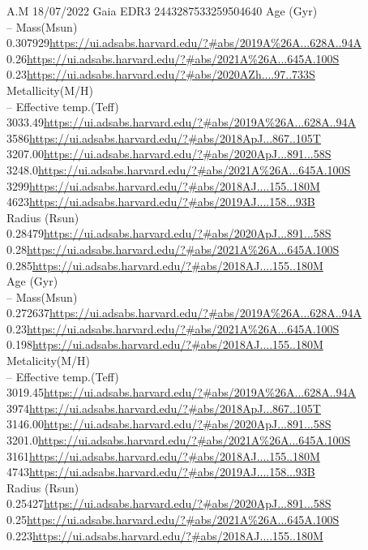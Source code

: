 A.M 18/07/2022
Gaia EDR3 2443287533259504640
Age (Gyr)\\
--
Mass(Msun)\\
0.307929\url{https://ui.adsabs.harvard.edu/?#abs/2019A%26A...628A..94A}\\
0.26\url{https://ui.adsabs.harvard.edu/?#abs/2021A%26A...645A.100S}\\
0.23\url{https://ui.adsabs.harvard.edu/?#abs/2020AZh....97..733S}\\
Metallicity(M/H)\\
--
Effective temp.(Teff)\\
3033.49\url{https://ui.adsabs.harvard.edu/?#abs/2019A%26A...628A..94A}\\
3586\url{https://ui.adsabs.harvard.edu/?#abs/2018ApJ...867..105T}\\
3207.00\url{https://ui.adsabs.harvard.edu/?#abs/2020ApJ...891...58S}\\
3248.0\url{https://ui.adsabs.harvard.edu/?#abs/2021A%26A...645A.100S}\\
3299\url{https://ui.adsabs.harvard.edu/?#abs/2018AJ....155..180M}\\
4623\url{https://ui.adsabs.harvard.edu/?#abs/2019AJ....158...93B}\\
Radius (Rsun)\\
0.28479\url{https://ui.adsabs.harvard.edu/?#abs/2020ApJ...891...58S}\\
0.28\url{https://ui.adsabs.harvard.edu/?#abs/2021A%26A...645A.100S}\\
0.285\url{https://ui.adsabs.harvard.edu/?#abs/2018AJ....155..180M}\\

Age (Gyr)\\
--
Mass(Msun)\\
0.272637\url{https://ui.adsabs.harvard.edu/?#abs/2019A%26A...628A..94A}\\
0.23\url{https://ui.adsabs.harvard.edu/?#abs/2021A%26A...645A.100S}\\
0.198\url{https://ui.adsabs.harvard.edu/?#abs/2018AJ....155..180M}\\
Metalicity(M/H)\\
--
Effective temp.(Teff)\\
3019.45\url{https://ui.adsabs.harvard.edu/?#abs/2019A%26A...628A..94A}\\
3974\url{https://ui.adsabs.harvard.edu/?#abs/2018ApJ...867..105T}\\
3146.00\url{https://ui.adsabs.harvard.edu/?#abs/2020ApJ...891...58S}\\
3201.0\url{https://ui.adsabs.harvard.edu/?#abs/2021A%26A...645A.100S}\\
3161\url{https://ui.adsabs.harvard.edu/?#abs/2018AJ....155..180M}\\
4743\url{https://ui.adsabs.harvard.edu/?#abs/2019AJ....158...93B}\\
Radius (Rsun)\\
0.25427\url{https://ui.adsabs.harvard.edu/?#abs/2020ApJ...891...58S}\\
0.25\url{https://ui.adsabs.harvard.edu/?#abs/2021A%26A...645A.100S}\\
0.223\url{https://ui.adsabs.harvard.edu/?#abs/2018AJ....155..180M}\\